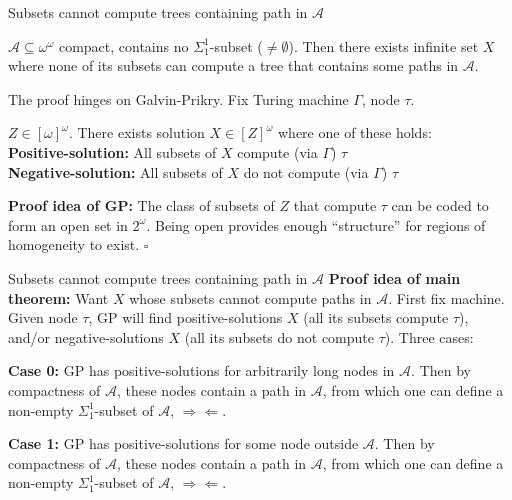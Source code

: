 \begin{frame}{Subsets cannot compute trees containing path in $\mathcal{A}$}
  \begin{main-thm*}
    $\mathcal{A}\subseteq\omega^\omega$ compact, contains no
    $\Sigma_1^1$-subset ($\neq\emptyset$). Then there exists infinite set
    $X$ where none of its subsets can compute a tree that contains some
    paths in $\mathcal{A}$.
  \end{main-thm*}

  The proof hinges on Galvin-Prikry. Fix Turing machine $\Gamma$, node
  $\tau$.
  \begin{fact*}
    $Z\in[\omega]^\omega$. There exists solution $X\in[Z]^\omega$
    where one of these holds:\\
    \textbf{Positive-solution:} All subsets of $X$ compute (via $\Gamma$)
    $\tau$ \\
    \textbf{Negative-solution:} All subsets of $X$ do not compute (via
    $\Gamma$) $\tau$
  \end{fact*}
  \textbf{Proof idea of GP:} The class of subsets of $Z$ that
  compute $\tau$ can be coded to form an open set in $2^\omega$. Being
  open provides enough ``structure'' for regions of homogeneity to exist.
  $\square$
\end{frame}

\begin{frame}{Subsets cannot compute trees containing path in $\mathcal{A}$}
  \textbf{Proof idea of main theorem:} Want $X$ whose subsets cannot
  compute paths in $\mathcal{A}$. First fix machine. Given node
  $\tau$, GP will find positive-solutions $X$ (all its subsets compute
  $\tau$), and/or negative-solutions $X$ (all its subsets do not compute
  $\tau$). Three cases:

  \vspace{1em}
  \textbf{Case 0:} GP has positive-solutions for arbitrarily long nodes in
  $\mathcal{A}$. Then by compactness of $\mathcal{A}$, these nodes contain
  a path in $\mathcal{A}$, from which one can define a non-empty
  $\Sigma_1^1$-subset of $\mathcal{A}$, $\Rightarrow\Leftarrow$.

  \vspace{0.5em}
  \textbf{Case 1:} GP has positive-solutions for some node outside
  $\mathcal{A}$. Then by compactness of $\mathcal{A}$, these nodes contain
  a path in $\mathcal{A}$, from which one can define a non-empty
  $\Sigma_1^1$-subset of $\mathcal{A}$, $\Rightarrow\Leftarrow$.
\end{frame}

